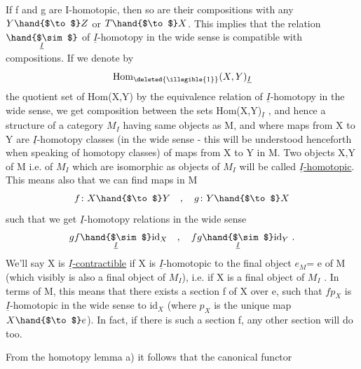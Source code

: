 If f and g are I-homotopic, then so are their compositions with
any $Y \hand{$\to$} Z$ or $T \hand{$\to$} X$. This implies that the relation $\underset{\underline{I}}{\hand{$\sim$}}$ of $\underline{I}$-homotopy
in the wide sense is compatible with compositions. If we denote by
\[ \mathrm{Hom}_{\deleted{\illegible{1}}}(X,Y)_{\underline{I}} \]
the quotient set of Hom(X,Y) by the equivalence relation of $\underline{I}$-homotopy in
the wide sense, we get composition between the sets Hom(X,Y)$_{\underline{I}}$ , and
hence a structure of a category $M_I$ having same objects as M, and where
maps from X to Y are $\underline{I}$-homotopy classes (in the wide sense - this will
be understood henceforth when speaking of homotopy classes) of maps from
X to Y in M. Two objects X,Y of M i.e. of $M_I$ which are isomorphic as
objects of $M_I$ will be called \uline{$\underline{I}$-homotopic}. This means also that we can
find maps in M 
\[ f\colon X \hand{$\to$} Y \quad , \quad g\colon Y \hand{$\to$} X \]
such that  we get $\underline{I}$-homotopy relations in the wide sense
\[ gf \underset{\underline{I}}{\hand{$\sim$}} \mathrm{id}_X \quad , \quad fg \underset{\underline{I}}{\hand{$\sim$}} \mathrm{id}_Y \ . \]
We'll say X is \uline{$\underline{I}$-contractible} if X is $\underline{I}$-homotopic to the final object $e_M$=
e of M (which visibly is also a final object of $M_I$), i.e. if X is a
final object of $M_I$ . In terms of M, this means that there exists a
section f of X over e, such that $fp_X$ is $\underline{I}$-homotopic in the wide sense
to $\mathrm{id}_X$ (where $p_X$ is the unique map $X \hand{$\to$} e$). In fact, if there is such a
section f, any other section will do too.

From the homotopy lemma a) it follows that the canonical functor
